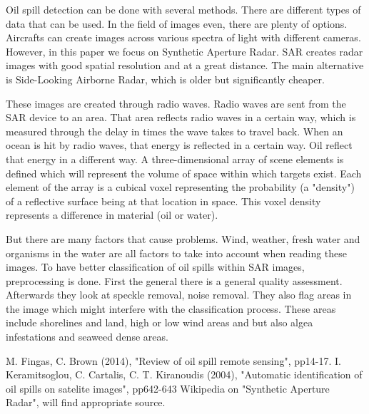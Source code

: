 \hspace{0.5cm} Oil spill detection can be done with several methods. There are different types of data that can be used. In the field of images even, there are plenty of options. Aircrafts can create images across various spectra of light with different cameras. However, in this paper we focus on Synthetic Aperture Radar. SAR creates radar images with good spatial resolution and at a great distance. The main alternative is Side-Looking Airborne Radar, which is older but significantly cheaper. 

These images are created through radio waves. Radio waves are sent from the SAR device to an area. That area reflects radio waves in a certain way, which is measured through the delay in times the wave takes to travel back. When an ocean is hit by radio waves, that energy is reflected in a certain way. Oil reflect that energy in a different way. A three-dimensional array of scene elements is defined which will represent the volume of space within which targets exist. Each element of the array is a cubical voxel representing the probability (a "density") of a reflective surface being at that location in space. This voxel density represents a difference in material (oil or water).

But there are many factors that cause problems. Wind, weather, fresh water and organisms in the water are all factors to take into account when reading these images. To have better classification of oil spills within SAR images, preprocessing is done. First the general there is a general quality assessment. Afterwards they look at speckle removal, noise removal. They also flag areas in the image which might interfere with the classification process. These areas include shorelines and land, high or low wind areas and but also algea infestations and seaweed dense areas. 

M. Fingas, C. Brown (2014), "Review of oil spill remote sensing", pp14-17. \newline
I. Keramitsoglou, C. Cartalis, C. T. Kiranoudis (2004), "Automatic identification of oil spills on satelite images", pp642-643\newline
Wikipedia on "Synthetic Aperture Radar", will find appropriate source.

